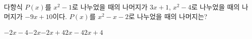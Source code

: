 다항식 $P(x)$를 $x^2-1$로 나누었을 때의 나머지가 $3x+1$, $x^2-4$로 나누었을 때의 나머지가 $-9x+10$이다. $P(x)$를 $x^2-x-2$로 나누었을 때의 나머지는?
\begin{choices32}{$-2x-4$}{$-2x$}{$-2x+4$}{$2x-4$}{$2x+4$}\end{choices32}

